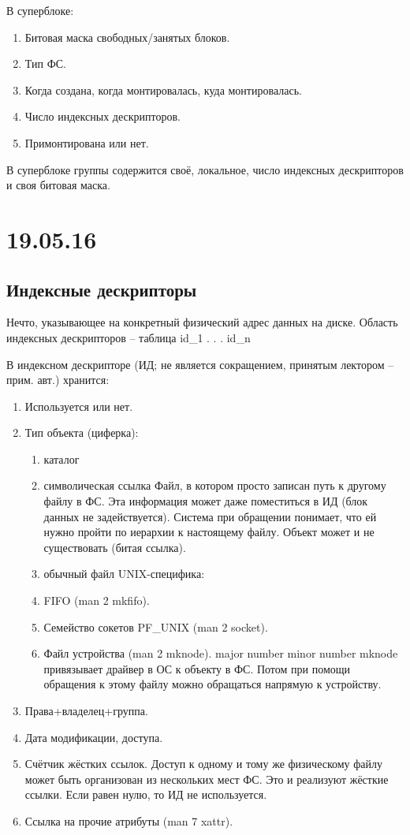 \documentclass[a4paper,10pt]{article}
\begin{document}
В суперблоке:
\begin{enumerate}
 \item Битовая маска свободных/занятых блоков.
 \item Тип ФС.
 \item Когда создана, когда монтировалась, куда монтировалась.
 \item Число индексных дескрипторов.
 \item Примонтирована или нет.
\end{enumerate}
В суперблоке группы содержится своё, локальное, число индексных дескрипторов и своя битовая маска.

\section{19.05.16}
\subsection{Индексные дескрипторы}
Нечто, указывающее на конкретный физический адрес данных на диске.
Область индексных дескрипторов -- таблица 
id\_1
.
.
.
id\_n

В индексном дескрипторе (ИД; не является сокращением, принятым лектором -- прим. авт.) хранится:
\begin{enumerate}
 \item Используется или нет.
 \item Тип объекта (циферка):
 \begin{enumerate}
 \item каталог
 \item символическая ссылка
 Файл, в котором просто записан путь к другому файлу в ФС. Эта информация может даже поместиться в ИД (блок данных не задействуется). Система при обращении понимает, что ей нужно пройти по иерархии к настоящему файлу.
 Объект может и не существовать (битая ссылка).
 \item обычный файл 
 UNIX-специфика:
 \item FIFO (man 2 mkfifo).
 \item Семейство сокетов PF\_UNIX (man 2 socket).
 \item Файл устройства (man 2 mknode).
 major number
 minor number
 mknode привязывает драйвер в ОС к объекту в ФС. Потом при помощи обращения к этому файлу можно обращаться напрямую к устройству.
\end{enumerate}
\item Права+владелец+группа.
\item Дата модификации, доступа.
\item Счётчик жёстких ссылок. Доступ к одному и тому же физическому файлу может быть организован из нескольких мест ФС. Это и реализуют жёсткие ссылки. Если равен нулю, то ИД не используется.
\item Ссылка на прочие атрибуты (man 7 xattr).
\end{enumerate}
\end{document}
